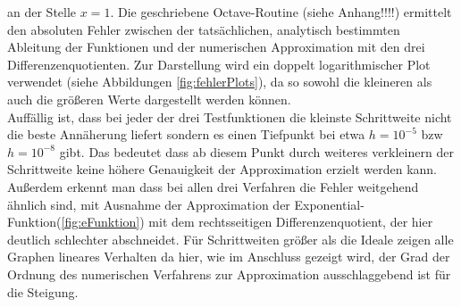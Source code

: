 an der Stelle $x=1$. Die geschriebene Octave-Routine (siehe Anhang!!!!) ermittelt den absoluten Fehler zwischen der tatsächlichen, analytisch bestimmten Ableitung der Funktionen und der numerischen Approximation mit den drei Differenzenquotienten. Zur Darstellung wird ein doppelt logarithmischer Plot verwendet (siehe Abbildungen \ref{fig:fehlerPlots}), da so sowohl die kleineren als auch die größeren Werte dargestellt werden können.\\
Auffällig ist, dass bei jeder der drei Testfunktionen die kleinste Schrittweite nicht die beste Annäherung liefert sondern es einen Tiefpunkt bei etwa $h=10^{-5}$ bzw $h=10^{-8}$ gibt. Das bedeutet dass ab diesem Punkt durch weiteres verkleinern der Schrittweite keine höhere Genauigkeit der Approximation erzielt werden kann. Außerdem erkennt man dass bei allen drei Verfahren die Fehler weitgehend ähnlich sind, mit Ausnahme der Approximation der Exponential-Funktion(\ref{fig:eFunktion}) mit dem rechtsseitigen Differenzenquotient, der hier deutlich schlechter abschneidet. Für Schrittweiten größer als die Ideale zeigen alle Graphen lineares Verhalten da hier, wie im Anschluss gezeigt wird, der Grad der Ordnung des numerischen Verfahrens zur Approximation ausschlaggebend ist für die Steigung. 
